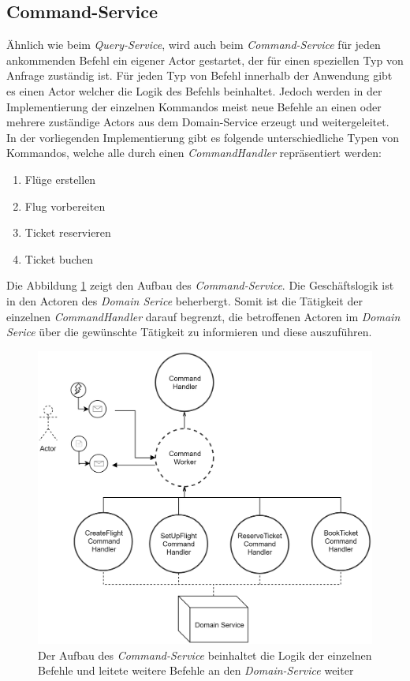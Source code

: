 \subsection{Command-Service}
\label{subsec:implementation:commandService}
 Ähnlich wie beim \textit{Query-Service}, wird auch beim \textit{Command-Service} für jeden ankommenden Befehl ein eigener Actor gestartet, der für einen speziellen Typ von Anfrage zuständig ist. Für jeden Typ von Befehl innerhalb der Anwendung gibt es einen Actor welcher die Logik des Befehls beinhaltet. Jedoch werden in der Implementierung der einzelnen Kommandos meist neue Befehle an einen oder mehrere zuständige Actors aus dem Domain-Service erzeugt und weitergeleitet. \\
 In der vorliegenden Implementierung gibt es folgende unterschiedliche Typen von Kommandos, welche alle durch einen \textit{CommandHandler} repräsentiert werden:
 \begin{enumerate}
     \item Flüge erstellen
     \item Flug vorbereiten
     \item Ticket reservieren
     \item Ticket buchen
 \end{enumerate}
Die Abbildung \ref{fig:implementation:commandActorModel} zeigt den Aufbau des \textit{Command-Service}. Die  Geschäftslogik ist  in den Actoren des \textit{Domain Serice} beherbergt. Somit ist die Tätigkeit der einzelnen \textit{CommandHandler} darauf begrenzt, die betroffenen Actoren im \textit{Domain Serice} über die gewünschte Tätigkeit zu informieren und diese  auszuführen. 
 \begin{figure}
    \centering
    \includegraphics[width=0.8\linewidth]{gfx/implementation/CommandServiceActorModel}
    \caption{Der Aufbau des \textit{Command-Service} beinhaltet die Logik der einzelnen Befehle und leitete weitere Befehle an den \textit{Domain-Service} weiter }
    \label{fig:implementation:commandActorModel}
\end{figure} 

